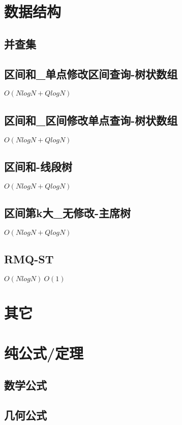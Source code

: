 \documentclass[10pt]{article}
\begin{document}
\section{数据结构}
\subsection{并查集}


\subsection{区间和\_单点修改区间查询-树状数组}
$O(NlogN+QlogN)$


\subsection{区间和\_区间修改单点查询-树状数组}
$O(NlogN+QlogN)$


\subsection{区间和-线段树}
$O(NlogN+QlogN)$


\subsection{区间第k大\_无修改-主席树}
$O(NlogN+QlogN)$


\subsection{RMQ-ST}
$O(NlogN)~O(1)$

\section{其它}
\section{纯公式/定理}
\subsection{数学公式}


\subsection{几何公式}

\end{document}
